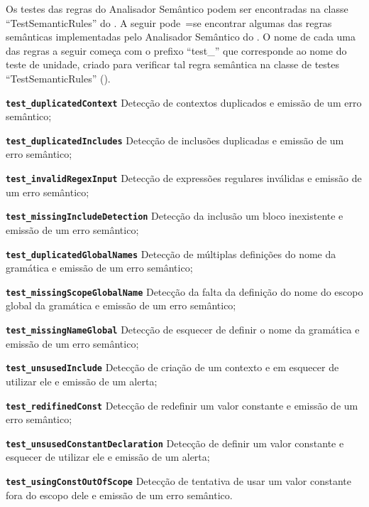 Os testes das regras do Analisador Semântico podem ser encontradas na classe ``TestSemanticRules'' do .
A seguir pode~=se encontrar algumas das regras semânticas implementadas pelo Analisador Semântico do .
O nome de cada uma das regras a seguir começa com o prefixo ``test\_'' que corresponde ao nome do teste de unidade,
criado para verificar tal regra semântica na classe de testes ``TestSemanticRules'' ().
\begin{enumerateoptional}[1)]
    \item[\bfseries\texttt{test_duplicatedContext}] Detecção de contextos duplicados e
    emissão de um erro semântico;

    \item[\bfseries\texttt{test_duplicatedIncludes}] Detecção de inclusões duplicadas  e
    emissão de um erro semântico;

    \item[\bfseries\texttt{test_invalidRegexInput}] Detecção de expressões regulares inválidas e
    emissão de um erro semântico;

    \item[\bfseries\texttt{test_missingIncludeDetection}] Detecção da inclusão um bloco inexistente e
    emissão de um erro semântico;

    \item[\bfseries\texttt{test_duplicatedGlobalNames}] Detecção de múltiplas definições do nome da gramática e
    emissão de um erro semântico;

    \item[\bfseries\texttt{test_missingScopeGlobalName}] Detecção da falta da definição do nome do escopo global da gramática e
    emissão de um erro semântico;

    \item[\bfseries\texttt{test_missingNameGlobal}] Detecção de esquecer de definir o nome da gramática e
    emissão de um erro semântico;

    \item[\bfseries\texttt{test_unsusedInclude}] Detecção de criação de um contexto e
    em esquecer de utilizar ele e
    emissão de um alerta;

    \item[\bfseries\texttt{test_redifinedConst}] Detecção de redefinir um valor constante e
    emissão de um erro semântico;

    \item[\bfseries\texttt{test_unsusedConstantDeclaration}] Detecção de definir um valor constante e esquecer de utilizar ele e
    emissão de um alerta;

    \item[\bfseries\texttt{test_usingConstOutOfScope}] Detecção de tentativa de usar um valor constante fora do escopo dele e
    emissão de um erro semântico.
\end{enumerateoptional}%
